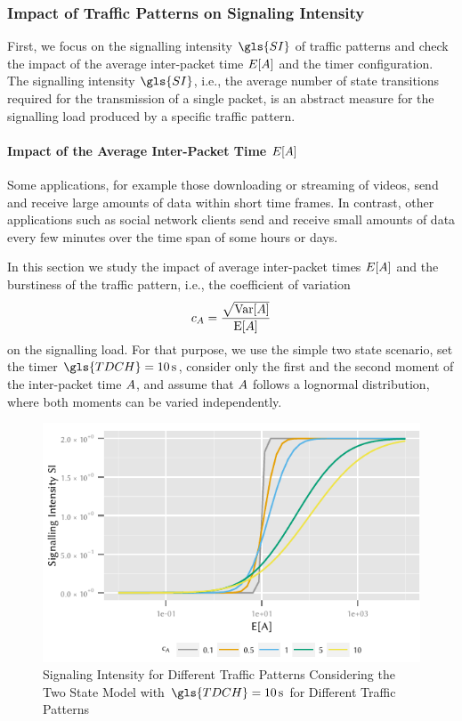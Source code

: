 \subsubsection*{Impact of Traffic Patterns on Signaling Intensity}\label{sec:network:performance_model:signalling_intensity}
First, we focus on the signalling intensity \(\gls{SI}\) of traffic patterns and check the impact of the average inter-packet time \(E[A]\) and the timer configuration. The signalling intensity \(\gls{SI}\), i.e., the average number of state transitions required for the transmission of a single packet, is an abstract measure for the signalling load produced by a specific traffic pattern.

\paragraph*{Impact of the Average Inter-Packet Time \(E[A]\)}\label{sec:network:performance_model:signalling_intensity:ea}
Some applications, for example those downloading or streaming of videos, send and receive large amounts of data within short time frames.
In contrast, other applications such as social network clients send and receive small amounts of data every few minutes over the time span of some hours or days.

In this section we study the impact of average inter-packet times \(E[A]\) and the burstiness of the traffic pattern, i.e., the coefficient of variation 
\[c_{A} = \frac{\sqrt{\mathrm{Var}[A]}}{\mathrm{E}[A]}\]
 on the signalling load.
For that purpose, we use the simple two state scenario, set the timer \(\gls{TDCH}=\SI{10}{\second}\), consider only the first and the second moment of the inter-packet time \(A\), and assume that \(A\) follows a lognormal distribution, where both moments can be varied independently.

\begin{figure}
	\centering
	\includegraphics{network/performance_model/numerical_examples/figures/2state_ea_si}
	\caption{Signaling Intensity for Different Traffic Patterns Considering the Two State Model with \(\gls{TDCH}=\SI{10}{\second}\) for Different Traffic Patterns}
	\label{fig:network:performance_model:numerical_examples:validations:analytic_vs_simulation:2state_ea_si}
\end{figure}

